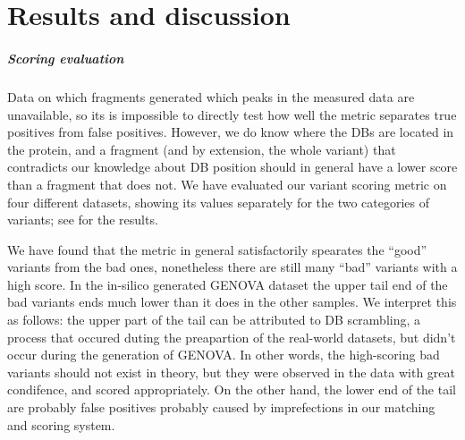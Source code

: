 \chapter{Results and discussion}

\paragraph{Scoring evaluation} Data on which fragments generated which peaks in the measured data are unavailable, so its is impossible to directly test how well the metric separates true positives from false positives. However, we do know where the DBs are located in the protein, and a fragment (and by extension, the whole variant) that contradicts our knowledge about DB position should in general have a lower score than a fragment that does not. We have evaluated our variant scoring metric on four different datasets, showing its values separately for the two categories of variants; see  for the results.

We have found that the metric in general satisfactorily spearates the ``good'' variants from the bad ones, nonetheless there are still many ``bad'' variants with a high score. In the in-silico generated GENOVA dataset the upper tail end of the bad variants ends much lower than it does in the other samples. We interpret this as follows: the upper part of the tail can be attributed to DB scrambling, a process that occured duting the preapartion of the real-world datasets, but didn't occur during the generation of GENOVA. In other words, the high-scoring bad variants should not exist in theory, but they were observed  in the data with great condifence, and scored appropriately. On the other hand, the lower end of the tail are probably false positives probably caused by imprefections in our matching and scoring system.

